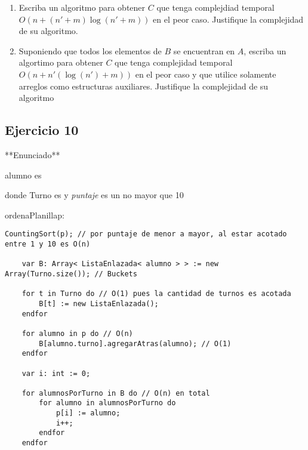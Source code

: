 \begin{enumerate}
    \item Escriba un algoritmo para obtener $C$ que tenga complejdiad temporal $O(n + (n' + m)\log(n' + m))$ en el peor caso. Justifique la complejidad de su algoritmo.
    \item Suponiendo que todos los elementos de $B$ se encuentran en $A$, escriba un algortimo para obtener $C$ que tenga complejidad temporal $O(n + n'(\log(n') + m))$ en el peor caso y que utilice solamente arreglos como estructuras auxiliares. Justifique la complejidad de su algoritmo
\end{enumerate}

\hacer

\pagebreak

\subsection{Ejercicio 10}
**Enunciado**

alumno es 

donde Turno es  y \textit{puntaje} es un \nat no mayor que 10
\begin{proc}{ordenaPlanilla}{\Inout p: }{}
    \begin{lstlisting}[numbers=none,frame=none]
    CountingSort(p); // por puntaje de menor a mayor, al estar acotado entre 1 y 10 es O(n)

    var B: Array< ListaEnlazada< alumno > > := new Array(Turno.size()); // Buckets
    
    for t in Turno do // O(1) pues la cantidad de turnos es acotada
        B[t] := new ListaEnlazada();
    endfor

    for alumno in p do // O(n)
        B[alumno.turno].agregarAtras(alumno); // O(1)
    endfor

    var i: int := 0;

    for alumnosPorTurno in B do // O(n) en total
        for alumno in alumnosPorTurno do
            p[i] := alumno;
            i++;
        endfor
    endfor
    \end{lstlisting}
\end{proc}

